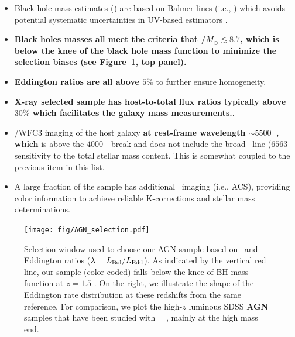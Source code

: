 \documentclass[apj]{emulateapj}
\begin{document}
\begin{itemize}

\item Black hole mass estimates (\mbh) are based on Balmer lines (i.e., \halpha) which avoids potential systematic uncertainties in UV-based estimators \citep{Greene2005}.

\item {\bf Black holes masses all meet the criteria that \mbh/$M_{\odot}\lesssim8.7$, which is below the knee of the black hole mass function to minimize the selection biases (see Figure~\ref{fig:selection}, top panel).} %

\item {\bf Eddington ratios are all above $5\%$} to further ensure homogeneity.

\item {\bf X-ray selected sample has host-to-total flux ratios typically above $30\%$ which facilitates the galaxy mass measurements.}. %

\item \hst/WFC3 imaging of the host galaxy {\bf at rest-frame wavelength $\sim5500$~\angstrom, which} is above the $4000$~\angstrom\ break and does not include the broad \halpha\ line ($6563$~ sensitivity to the total stellar mass content. This is somewhat coupled to the previous item in this list.

\item A large fraction of the sample has additional \hst\ imaging (i.e., ACS), providing color information to achieve reliable K-corrections and stellar mass determinations. 
\end{itemize}

\begin{figure}
\centering
{
\texttt{[image: fig/AGN\_selection.pdf]}
}
\caption{\label{fig:selection} Selection window used to choose our AGN sample based on  \mbh~and Eddington ratios ($\lambda = L_{\rm Bol}/L_{\rm Edd}$). As indicated by the vertical red line, our sample (color coded) falls below the knee of BH mass function at $z=1.5$ \citep[top panel,][]{Schulze2015}. On the right, we illustrate the shape of the Eddington rate distribution at these redshifts from the same reference. For comparison, we plot the high-$z$ luminous SDSS {\bf AGN} samples that have been studied with \hst\ ~\citep[grey squares and circles from][respectively]{Peng2006a, Decarli2010}, mainly at the high mass end.}
\end{figure} 
\end{document}
